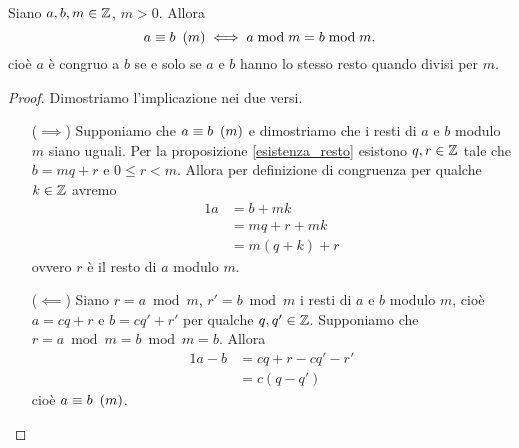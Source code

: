 \begin{theorem}  \label{equiv_congr_resto}
    Siano $a, b, m \in \mathbb{Z}$, $m > 0$. Allora
    \begin{equation}
        a \equiv b \ \left(m\right) \iff a \bmod m = b \bmod m.
    \end{equation}
    cioè $a$ è congruo a $b$ se e solo se $a$ e $b$ hanno lo stesso resto quando divisi per $m$.
\end{theorem}
\begin{proof}
    Dimostriamo l'implicazione nei due versi.
    \begin{itemize}
        \item[($\implies$)]
        Supponiamo che $a \equiv b \ \left(m\right)$ e dimostriamo che i resti di $a$ e $b$ modulo $m$ siano uguali.
        Per la proposizione \ref{esistenza_resto} esistono $q, r \in \mathbb{Z}$ tale che $b = mq + r$ e $0 \leq r < m$.
        Allora per definizione di congruenza per qualche $k \in \mathbb{Z}$ avremo
        \begin{alignat*}
            {1}
            a &= b + mk \\
            &= mq + r + mk \\
            &= m(q + k) + r
        \end{alignat*}
        ovvero $r$ è il resto di $a$ modulo $m$.
        \item[($\impliedby$)] Siano $r = a \bmod m$, $r' = b \bmod m$ i resti di $a$ e $b$ modulo $m$, cioè $a = cq + r$ e $b = cq' + r'$ per qualche $q, q' \in \mathbb{Z}$. Supponiamo che $r = a \bmod m = b \bmod m = b$. Allora
        \begin{alignat*}
            {1}
            a - b &= cq + r - cq' - r' \\
                &= c(q - q')
        \end{alignat*}
        cioè $a \equiv b \ \left(m\right)$. \qedhere
        \end{itemize}
\end{proof}

